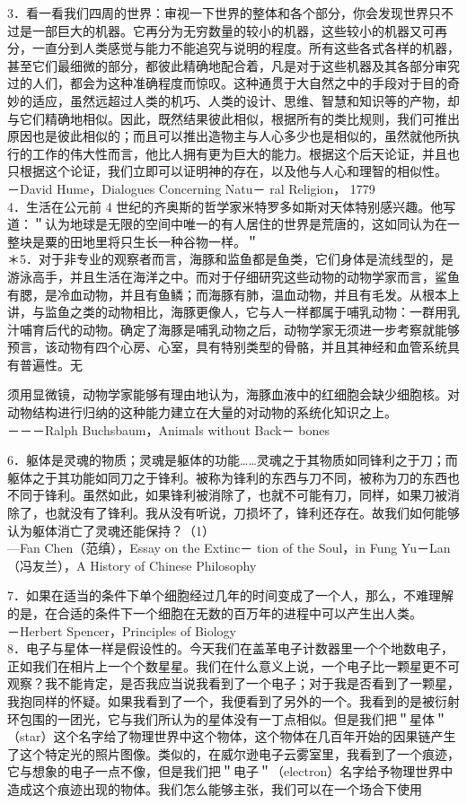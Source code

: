 3．看一看我们四周的世界：审视一下世界的整体和各个部分，你会发现世界只不过是一部巨大的机器。它再分为无穷数量的较小的机器，这些较小的机器又可再分，一直分到人类感觉与能力不能追究与说明的程度。所有这些各式各样的机器，甚至它们最细微的部分，都彼此精确地配合着，凡是对于这些机器及其各部分审究过的人们，都会为这种准确程度而惊叹。这种通贯于大自然之中的手段对于目的奇妙的适应，虽然远超过人类的机巧、人类的设计、思维、智慧和知识等的产物，却与它们精确地相似。因此，既然结果彼此相似，根据所有的类比规则，我们可推出原因也是彼此相似的；而且可以推出造物主与人心多少也是相似的，虽然就他所执行的工作的伟大性而言，他比人拥有更为巨大的能力。根据这个后天论证，并且也只根据这个论证，我们立即可以证明神的存在，以及他与人心和理智的相似性。\\
－David Hume，Dialogues Concerning Natu－ ral Religion， 1779\\
4．生活在公元前 4 世纪的齐奥斯的哲学家米特罗多如斯对天体特别感兴趣。他写道：＂认为地球是无限的空间中唯一的有人居住的世界是荒唐的，这如同认为在一整块是粟的田地里将只生长一种谷物一样。＂\\
＊5．对于非专业的观察者而言，海豚和监鱼都是鱼类，它们身体是流线型的，是游泳高手，并且生活在海洋之中。而对于仔细研究这些动物的动物学家而言，鲨鱼有腮，是冷血动物，并且有鱼鳞；而海豚有肺，温血动物，并且有毛发。从根本上讲，与监鱼之类的动物相比，海豚更像人，它与人一样都属于哺乳动物：一群用乳汁哺育后代的动物。确定了海豚是哺乳动物之后，动物学家无须进一步考察就能够预言，该动物有四个心房、心室，具有特别类型的骨骼，并且其神经和血管系统具有普遍性。无

须用显微镜，动物学家能够有理由地认为，海豚血液中的红细胞会缺少细胞核。对动物结构进行归纳的这种能力建立在大量的对动物的系统化知识之上。\\
－－－Ralph Buchsbaum，Animals without Back－ bones

6．躯体是灵魂的物质；灵魂是躯体的功能……灵魂之于其物质如同锋利之于刀；而躯体之于其功能如同刀之于锋利。被称为锋利的东西与刀不同，被称为刀的东西也不同于锋利。虽然如此，如果锋利被消除了，也就不可能有刀，同样，如果刀被消除了，也就没有了锋利。我从没有听说，刀损坏了，锋利还存在。故我们如何能够认为躯体消亡了灵魂还能保持？（1）\\
—Fan Chen（范缜），Essay on the Extinc－ tion of the Soul，in Fung Yu－Lan（冯友兰），A History of Chinese Philosophy

7．如果在适当的条件下单个细胞经过几年的时间变成了一个人，那么，不难理解的是，在合适的条件下一个细胞在无数的百万年的进程中可以产生出人类。\\
－Herbert Spencer，Principles of Biology\\
8．电子与星体一样是假设性的。今天我们在盖革电子计数器里一个个地数电子，正如我们在相片上一个个数星星。我们在什么意义上说，一个电子比一颗星更不可观察？我不能肯定，是否我应当说我看到了一个电子；对于我是否看到了一颗星，我抱同样的怀疑。如果我看到了一个，我便看到了另外的一个。我看到的是被衍射环包围的一团光，它与我们所认为的星体没有一丁点相似。但是我们把＂星体＂（star）这个名字给了物理世界中这个物体，这个物体在几百年开始的因果链产生了这个特定光的照片图像。类似的，在威尔逊电子云雾室里，我看到了一个痕迹，它与想象的电子一点不像，但是我们把＂电子＂（electron）名字给予物理世界中造成这个痕迹出现的物体。我们怎么能够主张，我们可以在一个场合下使用

